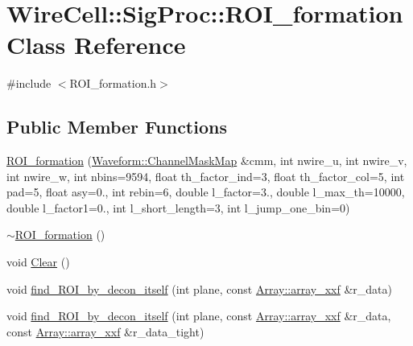 \hypertarget{class_wire_cell_1_1_sig_proc_1_1_r_o_i__formation}{}\section{Wire\+Cell\+:\+:Sig\+Proc\+:\+:R\+O\+I\+\_\+formation Class Reference}
\label{class_wire_cell_1_1_sig_proc_1_1_r_o_i__formation}


{\ttfamily \#include $<$R\+O\+I\+\_\+formation.\+h$>$}

\subsection*{Public Member Functions}
\begin{DoxyCompactItemize}
\item 
\hyperlink{class_wire_cell_1_1_sig_proc_1_1_r_o_i__formation_a9cd892f818e482c3eca9cbd7bca02c64}{R\+O\+I\+\_\+formation} (\hyperlink{namespace_wire_cell_1_1_waveform_a18b9ae61c858e340252ba3ac83ac3bc0}{Waveform\+::\+Channel\+Mask\+Map} \&cmm, int nwire\+\_\+u, int nwire\+\_\+v, int nwire\+\_\+w, int nbins=9594, float th\+\_\+factor\+\_\+ind=3, float th\+\_\+factor\+\_\+col=5, int pad=5, float asy=0., int rebin=6, double l\+\_\+factor=3., double l\+\_\+max\+\_\+th=10000, double l\+\_\+factor1=0., int l\+\_\+short\+\_\+length=3, int l\+\_\+jump\+\_\+one\+\_\+bin=0)
\item 
\hyperlink{class_wire_cell_1_1_sig_proc_1_1_r_o_i__formation_a1bbdd0a6ae3875975b72e0605c80353d}{$\sim$\+R\+O\+I\+\_\+formation} ()
\item 
void \hyperlink{class_wire_cell_1_1_sig_proc_1_1_r_o_i__formation_a04c89b4ac02b57c369a18c933f3ad203}{Clear} ()
\item 
void \hyperlink{class_wire_cell_1_1_sig_proc_1_1_r_o_i__formation_a4b9d583a94364252b8ef97742edfc21f}{find\+\_\+\+R\+O\+I\+\_\+by\+\_\+decon\+\_\+itself} (int plane, const \hyperlink{namespace_wire_cell_1_1_array_ab565fef5e33632bb02f0ed4be803020c}{Array\+::array\+\_\+xxf} \&r\+\_\+data)
\item 
void \hyperlink{class_wire_cell_1_1_sig_proc_1_1_r_o_i__formation_a4e8deab0b7d05b036ea57b3c9bc78c10}{find\+\_\+\+R\+O\+I\+\_\+by\+\_\+decon\+\_\+itself} (int plane, const \hyperlink{namespace_wire_cell_1_1_array_ab565fef5e33632bb02f0ed4be803020c}{Array\+::array\+\_\+xxf} \&r\+\_\+data, const \hyperlink{namespace_wire_cell_1_1_array_ab565fef5e33632bb02f0ed4be803020c}{Array\+::array\+\_\+xxf} \&r\+\_\+data\+\_\+tight)

\end{DoxyCompactItemize}
